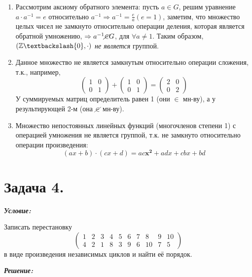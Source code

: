 \begin{enumerate}[label=\alph*)]
	\item Рассмотрим аксиому обратного элемента: пусть $a \in G$, решим уравнение $a \cdot a^{-1} = e$ относительно $a^{-1} \Rightarrow a^{-1} = \frac{e}{a} (e = 1)$, заметим, что множество целых чисел не замкнуто относительно операции деления, которая является обратной умножению, $\Rightarrow a^{-1} \cancel{\in} G$, для $\forall a \ne 1$. Таким образом, $(\mathbb{Z} \textbackslash \{0\}, \cdot)$ \textit{не является} группой.
	\item Данное множество не является замкнутым относительно операции сложения, т.к., например,
	\[
	\begin{pmatrix}
	1 & 0 \\ 0 & 1
	\end{pmatrix}
	+
	\begin{pmatrix}
	1 & 0 \\ 0 & 1
	\end{pmatrix}
	=
	\begin{pmatrix}
	2 & 0 \\ 0 & 2
	\end{pmatrix}
	\]
	У суммируемых матриц определитель равен 1 (они $\in$ мн-ву), а у результирующей 2-м (она $\cancel{\in}$ мн-ву).
	\item Множество непостоянных линейных функций (многочленов степени 1) с операцией умножения не является группой, т.к. не замкнуто относительно операции произведения:
	\[ (ax+b) \cdot (cx+d) = ac\mathbf{x^2} + adx + cbx + bd \]
\end{enumerate}

\section*{Задача 4.}

\noindent\textbf{\textit{Условие:}}

Записать перестановку
\[
\begin{pmatrix}
1 & 2 & 3 & 4 & 5 & 6 & 7 & 8 & 9 & 10 \\
4 & 2 & 1 & 8 & 3 & 9 & 6 & 10 & 7 & 5
\end{pmatrix}
\]
в виде произведения независимых циклов и найти её порядок.

\noindent\textbf{\textit{Решение:}}

\begin{center}
	\qquad
\end{center}

